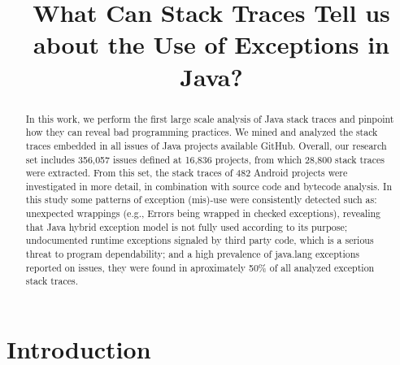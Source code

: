 \documentclass[conference]{IEEEtran}
\begin{document}
\title{What Can Stack Traces Tell us about the Use of Exceptions in Java?}

\author{
}

\newcommand{\todo}[1]{\textbf{TODO}\footnote{\textbf{TODO:} #1}}

\maketitle

\begin{abstract}

In this work, we perform the first large scale analysis of Java stack traces and
pinpoint how they can reveal bad programming practices. We mined and analyzed
the stack traces embedded in all issues of Java projects available GitHub.
Overall, our research set includes 356,057 issues defined at 16,836 projects, 
from which 28,800 stack traces were extracted. From this set, the stack traces
of 482 Android projects were investigated in more detail, in combination with
source code and bytecode analysis. In this study some patterns of exception
(mis)-use were consistently detected such as: unexpected wrappings (e.g., Errors
being wrapped in checked exceptions), revealing that Java hybrid exception
model is not fully used according to its purpose;  undocumented runtime
exceptions signaled by third party code, which is a serious threat to program
dependability; and a high prevalence of java.lang exceptions reported on issues,  
they were found in aproximately 50\% of all analyzed exception stack traces.


\end{abstract}


\section{Introduction}
\end{document}
